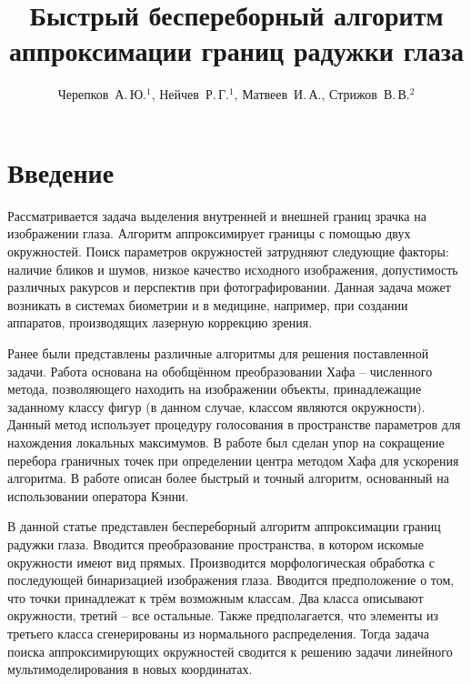 \documentclass[12pt,twoside]{article}
\title
    [Алгоритм аппроксимации границ радужки глаза] %
    {Быстрый беспереборный алгоритм аппроксимации границ радужки глаза}
\author
    [Автор~И.\,О.] %
    {Черепков~А.\,Ю.$^1$, Нейчев~Р.\,Г.$^1$, Матвеев~И.\,А., Стрижов~В.\,В.$^2$} %
\begin{document}
\maketitle
\section{Введение}
Рассматривается задача выделения внутренней и внешней границ зрачка на изображении глаза.  Алгоритм аппроксимирует границы с помощью двух окружностей. Поиск параметров окружностей затрудняют следующие факторы: наличие бликов и шумов, низкое качество исходного изображения, допустимость различных ракурсов и перспектив при фотографировании. Данная задача может возникать в системах биометрии и в медицине, например, при создании аппаратов, производящих лазерную коррекцию зрения.

Ранее были представлены различные алгоритмы для решения поставленной задачи. Работа \cite{Efimov2015} основана на обобщённом преобразовании Хафа -- численного метода, позволяющего находить на изображении объекты, принадлежащие заданному классу фигур (в данном случае, классом являются окружности). Данный метод использует процедуру голосования в пространстве параметров для нахождения локальных максимумов. В работе \cite{Efimov2015} был сделан упор на сокращение перебора граничных точек при определении центра методом Хафа для ускорения алгоритма. В работе \cite{Chigrinskiy2016} описан более быстрый и точный алгоритм, основанный на использовании оператора Кэнни.

В данной статье представлен беспереборный алгоритм аппроксимации границ радужки глаза. Вводится преобразование пространства, в котором искомые окружности имеют вид прямых. Производится морфологическая обработка с последующей бинаризацией изображения глаза. Вводится предположение о том, что точки принадлежат к трём возможным классам. Два класса описывают окружности, третий -- все остальные. Также предполагается, что элементы из третьего класса сгенерированы из нормального распределения. Тогда задача поиска аппроксимирующих окружностей сводится к решению задачи линейного мультимоделирования в новых координатах.




\end{document}

